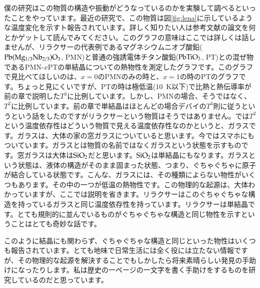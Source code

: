 \documentclass[10pt,b5paper,papersize,dvipdfmx]{jsbook}
\begin{document}
僕の研究はこの物質の構造や振動がどうなっているのかを実験して調べるといったことをやっています。最近の研究で、この物質は図\ref{fig:lena}に示しているような温度変化を示すト報告されています。詳しく知りたい人は参考文献\cite{relaxCT}の論文を何とかゲットして読んでみてください。このグラフの意味はここでは詳しくは話しませんが、リラクサーの代表例であるマグネシウムニオブ酸鉛($\rm{Pb(Mg_{1/3}Nb_{2/3})O_3}$, PMN)と普通の強誘電体チタン酸鉛($\rm{PbTiO_3}$, PT)との混ぜ物であるPMN-$x$PTの単結晶についての熱物性を測定したグラフです。このグラフで見比べてほしいのは、$x = 0$のPMNのみの時と、$x = 1$の時のPTのグラフです。ちょっと見にくいですが、PTの時は極低温(10~K以下)で比熱と熱伝導率が前の章で説明した$T^3$に比例しています。しかし、PMNの場合、そうではなく、$T^2$に比例しています。前の章で単結晶はほとんどの場合デバイの$T^3$則に従うというという話をしたのですがリラクサーという物質はそうではありません。では$T^2$という温度依存性はどういう物質で見える温度依存性なのかというと、ガラスです。ガラスは、大体の家の窓ガラスについていると思います。今ではスマホにもついています。ガラスとは物質の名前ではなくガラスという状態を示すものです。窓ガラスは大体は$\rm{SiO}_2$だと思います。$\rm{SiO}_2$は単結晶にもなります。ガラスという状態は、液体の構造がそのまま固まった状態、つまり、ぐちゃぐちゃに原子が結合している状態です。こんな、ガラスには、その種類によらない物性がいくつもあります。その中の一つが低温の熱物性です。この物理的な起源は、大体わかっていますが、ここでは説明を省きます。リラクサーはこのぐちゃぐちゃな構造を持っているガラスと同じ温度依存性を持っています。リラクサーは単結晶です。とても規則的に並んでいるものがぐちゃぐちゃな構造と同じ物性を示すということはとても奇妙な話です。\par
このように結晶にも関わらず、ぐちゃぐちゃな構造と同じといった物性はいくつも報告されています。とても地味で日常生活には全く役には立たない情報ですが、その物理的な起源を解決することでもしかしたら将来素晴らしい発見の手助けになったりします。私は歴史の一ページの一文字を書く手助けをするものを研究しているのだと思っています。
\end{document}
